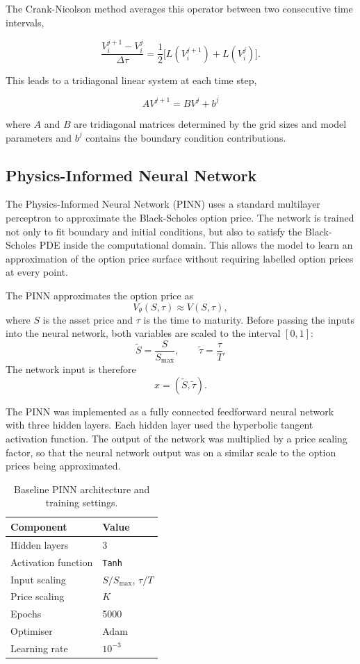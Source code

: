\documentclass[11pt,a4paper]{article}
\begin{document}
The Crank-Nicolson method averages this operator between two consecutive time intervals,

\begin{equation}\label{eq:5}
    \frac{V_i^{j+1}-V_i^j}{\Delta \tau } = \frac{1}{2} \biggr[ L(V_i^{j+1})+L(V_i^j)\biggr].
\end{equation}

This leads to a tridiagonal linear system at each time step,

\begin{equation}\label{eq:6}
    AV^{j+1}=BV^j+b^j
\end{equation}

where $A$ and $B$ are tridiagonal matrices determined by the grid sizes and model parameters and $b^j$ contains the boundary condition contributions.

\subsection{Physics-Informed Neural Network}

The Physics-Informed Neural Network (PINN) uses a standard multilayer perceptron to approximate the Black-Scholes option price. The network is trained not only to fit boundary and initial conditions, but also to satisfy the Black-Scholes PDE inside the computational domain. This allows the model to learn an approximation of the option price surface without requiring labelled option prices at every point.

The PINN approximates the option price as
\[
V_\theta(S,\tau) \approx V(S,\tau),
\]
where $S$ is the asset price and $\tau$ is the time to maturity. Before passing the inputs into the neural network, both variables are scaled to the interval $[0,1]$:
\[
\tilde{S} = \frac{S}{S_{\max}},
\qquad
\tilde{\tau} = \frac{\tau}{T}.
\]
The network input is therefore
\[
x = (\tilde{S}, \tilde{\tau}).
\]

The PINN was implemented as a fully connected feedforward neural network with three hidden layers. Each hidden layer used the hyperbolic tangent activation function. The output of the network was multiplied by a price scaling factor, so that the neural network output was on a similar scale to the option prices being approximated.

\begin{table}[H]
\centering
\begin{tabular}{ll}
\toprule
Component & Value \\
\midrule
Hidden layers & 3 \\
Activation function & \texttt{Tanh} \\
Input scaling & $S/S_{\max}$, $\tau/T$ \\
Price scaling & $K$ \\
Epochs & 5000 \\
Optimiser & Adam \\
Learning rate & $10^{-3}$ \\
\bottomrule
\end{tabular}
\caption{Baseline PINN architecture and training settings.}
\end{table}
\end{document}
